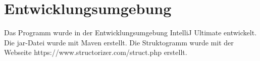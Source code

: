 \chapter{Entwicklungsumgebung}\label{ch:entwicklungsumgebung}
Das Programm wurde in der Entwicklungsumgebung IntelliJ Ultimate entwickelt.
Die jar-Datei wurde mit Maven erstellt.
Die Struktogramm wurde mit der Webseite https://www.structorizer.com/struct.php erstellt.
